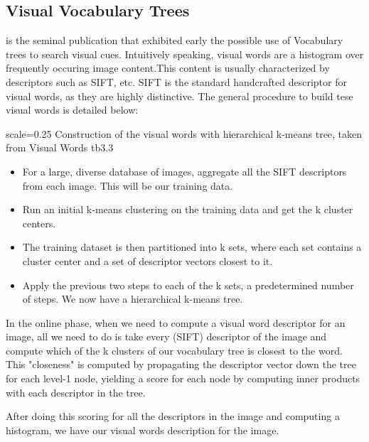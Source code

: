 \subsection{Visual Vocabulary Trees} %

\cite{Nister2006} is the seminal publication that exhibited early the possible use of Vocabulary trees to search visual cues. Intuitively speaking, visual words are a histogram over frequently occuring image content.This content is usually characterized by descriptors such as SIFT, etc.
SIFT is the standard handcrafted descriptor for visual words, as they are highly distinctive. The general procedure to build tese visual words is detailed below:

{scale=0.25}%
{Construction of the visual words with hierarchical k-means tree, taken from \cite{Nister2006}}%
{Visual Words}%
{tb3.3} %

\begin{itemize}
	\item For a large, diverse database of images, aggregate all the SIFT descriptors from each image. This will be our training data.\\
	\item Run an initial k-means clustering on the training data and get the k cluster centers.\\
	\item The training dataset is then partitioned into k sets, where each set contains a cluster center and a set of descriptor vectors closest to it.\\
	\item Apply the previous two steps to each of the k sets, a predetermined number of steps. We now have a hierarchical k-means tree.\\
\end{itemize}

In the online phase, when we need to compute a visual word descriptor for an image, all we need to do is take every (SIFT) descriptor of the image and compute 
which of the k clusters of our vocabulary tree is closest to the word. This "closeness" is computed by propagating the descriptor vector down the tree for each 
level-1 node, yielding a score for each node by computing inner products with each descriptor in the tree.

After doing this scoring for all the descriptors in the image and computing a histogram, we have our visual words description for the image. 

